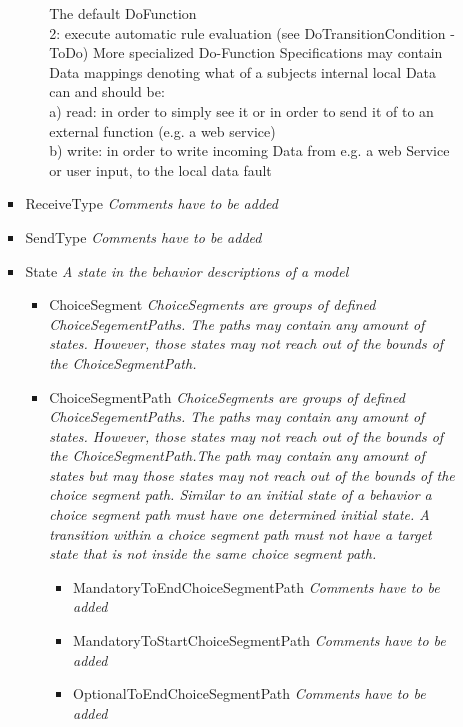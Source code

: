 \begin{itemize}
\begin{itemize}
\begin{itemize}
\begin{itemize}
{			The default DoFunction \\2: execute automatic rule evaluation (see DoTransitionCondition - ToDo)
			More specialized Do-Function Specifications may contain Data mappings denoting what of a subjects internal local Data can and should be:\\
			a) read: in order to simply see it or in order to send it of to an external function (e.g. a web service)\\
			b) write: in order to write incoming Data from e.g. a web Service or user input, to the local data fault}
		\end{itemize}
		\item ReceiveType \linebreak \textit{Comments have to be added}
		\item SendType \linebreak \textit{Comments have to be added}
		\item State \linebreak \textit{A state in the behavior descriptions of a model}
		\begin{itemize}
			\item ChoiceSegment \linebreak \textit{ChoiceSegments are groups of defined ChoiceSegementPaths. The paths may contain any amount of states. However, those states may not reach out of the bounds of the ChoiceSegmentPath.}
			\item ChoiceSegmentPath \linebreak \textit{ChoiceSegments are groups of defined ChoiceSegementPaths. The paths may contain any amount of states. However, those states may not reach out of the bounds of the ChoiceSegmentPath.The path may contain any amount of states but may those states may not reach out of the bounds of the choice segment path. Similar to an initial state of a behavior a choice segment path must have one determined initial state. A transition within a choice segment path must not have a target state that is not inside the same choice segment path.}
			\begin{itemize}
				\item MandatoryToEndChoiceSegmentPath \linebreak \textit{Comments have to be added}
				\item MandatoryToStartChoiceSegmentPath \linebreak \textit{Comments have to be added}
				\item OptionalToEndChoiceSegmentPath \linebreak \textit{Comments have to be added}

\end{itemize}
\end{itemize}
\end{itemize}
\end{itemize}
\end{itemize}
